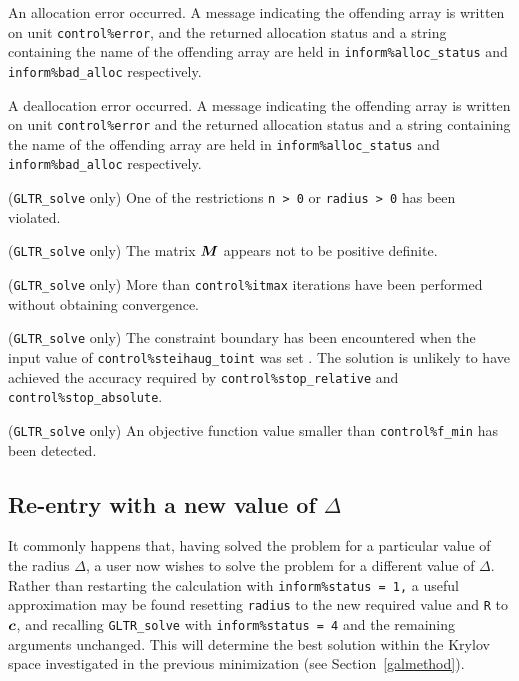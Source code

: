 \documentclass{galahad}
\newcommand{\packagename}{GL\-TR}
\begin{document}
\begin{description}
 An allocation error occurred. A message indicating
the offending
array is written on unit {\tt control\%error}, and the returned allocation
status and a string containing the name of the offending array
are held in {\tt inform\%alloc\_\-status}
and {\tt inform\%bad\_alloc} respectively.

 A deallocation error occurred.
A message indicating the offending
array is written on unit {\tt control\%error} and the returned allocation
status and a string containing the name of the offending array
are held in {\tt inform\%alloc\_\-status}
and {\tt inform\%bad\_alloc} respectively.

 ({\tt \packagename\_solve} only)
One of the restrictions
{\tt n > 0}
or
{\tt radius > 0}
has been violated.

 ({\tt \packagename\_solve} only)
The matrix ${\bm{M}}$ appears not to be positive definite.

 ({\tt \packagename\_solve} only) More than
{\tt control\%itmax} iterations have been performed without obtaining
convergence.

 ({\tt \packagename\_solve} only)
The constraint boundary has been
encountered when the input value of {\tt control\%steihaug\-\_\-toint} was
set \true. The
solution is unlikely to have achieved the accuracy required by
{\tt control\%stop\_rela\-tive} and {\tt control\%stop\_absolute}.

\itt{\galerrfmin} ({\tt \packagename\_solve} only)
An objective function value smaller than {\tt control\%f\_min} has
been detected.

\end{description}


\subsection{Re-entry with a new value of $\Delta$}
It commonly happens that, having solved the problem for a particular value
of the radius $\Delta$, a user now wishes to solve the problem for a different
value of $\Delta$. Rather than restarting the calculation with
{\tt inform\%status = 1,} a useful approximation may be found
resetting {\tt radius} to the new required value and {\tt R} to ${\bm{c}}$,
and recalling {\tt \packagename\_solve}
with {\tt inform\%status = 4} and the remaining arguments unchanged.
This will determine the best solution within the Krylov space investigated
in the previous minimization (see Section~\ref{galmethod}).
\end{document}
